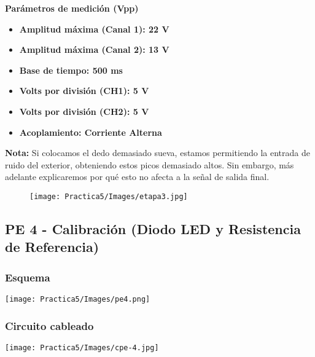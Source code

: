 \documentclass[12pt]{article}
\begin{document}
        \textbf{Parámetros de medición (Vpp)}
            \begin{multicols}{2}
                \begin{itemize}
                    \item[\checkmark] \textbf{Amplitud máxima (Canal 1): 22 V}
                
                    \item[\checkmark] \textbf{Amplitud máxima (Canal 2): 13 V}
                    \item[\checkmark] \textbf{Base de tiempo: 500 ms}
            \columnbreak
                    \item[\checkmark] \textbf{Volts por división (CH1): 5 V}
                    \item[\checkmark] \textbf{Volts por división (CH2): 5 V}
                    \item[\checkmark] \textbf{Acoplamiento: Corriente Alterna}
                \end{itemize}
            \end{multicols}
            
            \textbf{Nota:} Si colocamos el dedo demasiado sueva, estamos permitiendo la entrada de ruido del exterior, obteniendo estos picos demasiado altos. Sin embargo, más adelante explicaremos por qué esto no afecta a la señal de salida final.
         
            \begin{figure}[h!]
                \centering
                \texttt{[image: Practica5/Images/etapa3.jpg]}
            \end{figure}
        
        \newpage
        \subsection{PE 4 - Calibración (Diodo LED y Resistencia de Referencia)}
        \begin{multicols}{2}
            \subsubsection{Esquema}

                \texttt{[image: Practica5/Images/pe4.png]}

        \columnbreak
            \subsubsection{Circuito cableado}

                \texttt{[image: Practica5/Images/cpe-4.jpg]}

            \end{multicols}
            
\end{document}
